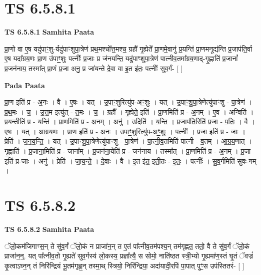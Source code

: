 \documentclass[17pt]{extarticle}
\begin{document}

\section{ TS 6.5.8.1 }

\textbf{TS 6.5.8.1 } \newline
\textbf{Samhita Paata} \newline

प्रा॒णो वा ए॒ष यदु॑पाꣳ॒॒शु-र्यदु॑पाꣳशुपा॒त्रेण॑ प्रथ॒मश्चो᳚त्त॒मश्च॒ ग्रहौ॑ गृ॒ह्येते᳚ प्रा॒णमे॒वानु॑ प्र॒यन्ति॑ प्रा॒णमनूद्य॑न्ति प्र॒जाप॑ति॒र्वा ए॒ष यदा᳚ग्रय॒णः प्रा॒ण उ॑पाꣳ॒॒शुः पत्नीः᳚ प्र॒जाः प्र ज॑नयन्ति॒ यदु॑पाꣳशुपा॒त्रेण॑ पात्नीव॒तमा᳚ग्रय॒णाद्-गृ॒ह्णाति॑ प्र॒जानां᳚ प्र॒जन॑नाय॒ तस्मा᳚त् प्रा॒णं प्र॒जा अनु॒ प्र जा॑यन्ते दे॒वा वा इ॒त इ॑तः॒ पत्नीः᳚ सुव॒र्गं- [  ] \newline

\textbf{Pada Paata} \newline

प्रा॒ण इति॑ प्र - अ॒नः । वै । ए॒षः । यत् । उ॒पाꣳ॒॒शुरित्यु॑प-अꣳ॒॒शुः । यत् । उ॒पाꣳ॒॒शु॒पा॒त्रेणेत्यु॑पाꣳशु - पा॒त्रेण॑ । प्र॒थ॒मः । च॒ । उ॒त्त॒म इत्यु॑त् - त॒मः । च॒ । ग्रहौ᳚ । गृ॒ह्येते॒ इति॑ । प्रा॒णमिति॑ प्र - अ॒नम् । ए॒व । अन्विति॑ । प्र॒यन्तीति॑ प्र - यन्ति॑ । प्रा॒णमिति॑ प्र - अ॒नम् । अनु॑ । उदिति॑ । य॒न्ति॒ । प्र॒जाप॑ति॒रिति॑ प्र॒जा - प॒तिः॒ । वै । ए॒षः । यत् । आ॒ग्र॒य॒णः । प्रा॒ण इति॑ प्र - अ॒नः । उ॒पाꣳ॒॒शुरित्यु॑प-अꣳ॒॒शुः । पत्नीः᳚ । प्र॒जा इति॑ प्र - जाः । प्रेति॑ । ज॒न॒य॒न्ति॒ । यत् । उ॒पाꣳ॒॒शु॒पा॒त्रेणेत्यु॑पाꣳशु - पा॒त्रेण॑ । पा॒त्नी॒व॒तमिति॑ पात्नी - व॒तम् । आ॒ग्र॒य॒णात् । गृ॒ह्णाति॑ । प्र॒जाना॒मिति॑ प्र - जाना᳚म् । प्र॒जन॑ना॒येति॑ प्र - जन॑नाय । तस्मा᳚त् । प्रा॒णमिति॑ प्र - अ॒नम् । प्र॒जा इति॑ प्र-जाः । अनु॑ । प्रेति॑ । जा॒य॒न्ते॒ । दे॒वाः । वै । इ॒त इ॑त॒ इती॒तः - इ॒तः॒ । पत्नीः᳚ । सु॒व॒र्गमिति॑ सुवः-गम् ।  \newline





\section{ TS 6.5.8.2 }

\textbf{TS 6.5.8.2 } \newline
\textbf{Samhita Paata} \newline

ॅलो॒कम॑जिगाꣳस॒न् ते सु॑व॒र्गं ॅलो॒कं न प्राजा॑न॒न् त ए॒तं पा᳚त्नीव॒तम॑पश्य॒न् तम॑गृह्णत॒ ततो॒ वै ते सु॑व॒र्गं ॅलो॒कं प्राजा॑न॒न्॒. यत् पा᳚त्नीव॒तो गृ॒ह्यते॑ सुव॒र्गस्य॑ लो॒कस्य॒ प्रज्ञा᳚त्यै॒ स सोमो॒ नाति॑ष्ठत स्त्री॒भ्यो गृ॒ह्यमा॑ण॒स्तं घृ॒तं ॅवज्रं॑ कृ॒त्वाऽघ्न॒न् तं निरि॑न्द्रियं भू॒तम॑गृह्ण॒न् तस्मा॒थ् स्त्रियो॒ निरि॑न्द्रिया॒ अदा॑यादी॒रपि॑ पा॒पात् पुꣳ॒॒स उप॑स्तितरं- [  ] \newline
\end{document}
